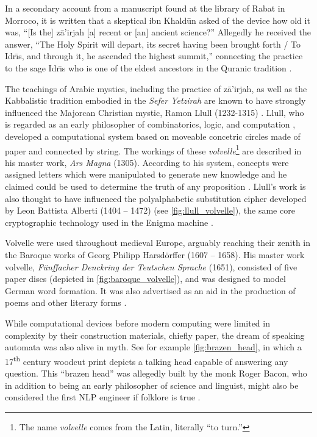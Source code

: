In a secondary account from a manuscript found at the library of Rabat in
Morroco, it is written that a skeptical ibn Khald\={u}n asked of the device
how old it was, ``[Is the] z\={a}'irjah [a] recent or [an] ancient science?''
Allegedly he received the answer, ``The  Holy  Spirit  will  depart,  its  secret
having been brought forth / To Idr\={\i}s, and through it, he ascended the
highest summit,'' connecting the practice to the sage Idr\={\i}s who is one of
the eldest ancestors in the Quranic tradition
\citep{rosenthal1958muqaddimah,link2010variantology}.
  
The teachings of Arabic mystics, including the practice of z\={a}'irjah, as
well as the Kabbalistic tradition embodied in the \textit{Sefer Yetzirah} are
known to have strongly influenced the Majorcan Christian mystic, Ramon Llull
(1232-1315) \citep{kahn1980,link2010variantology,sepllull}.  Llull, who is
regarded as an early philosopher of combinatorics, logic, and computation
\citep{bonner2007art,knuth2013art,sepllull}, developed a computational system
based on moveable concetric circles made of paper and connected by string. The
workings of these \textit{volvelle}\footnote{The name \textit{volvelle} comes
from the Latin, literally ``to turn.''} are described in his master work,
\textit{Ars Magna} (1305). According to his system, concepts were assigned
letters which were manipulated to generate new knowledge and he claimed could
be used to determine the truth of any proposition
\citep{Crupi2019VolvellesOK}. Llull's work is also thought to have influenced
the polyalphabetic substitution cipher developed by Leon Battista Alberti
(1404 -- 1472) (see \autoref{fig:llull_volvelle}), the same core cryptographic
technology used in the Enigma machine  \citep{kahn1980}.



 
 
Volvelle were used throughout medieval Europe, arguably reaching their zenith
in the Baroque works of Georg Philipp Harsd{\"o}rffer (1607 -- 1658). His
master work volvelle, \textit{F{\"u}nffacher Denckring der Teutschen Sprache}
(1651), consisted of five paper discs (depicted in
\autoref{fig:baroque_volvelle}), and was designed to model German word
formation. It was also advertised as an aid in the production of poems and
other literary forms \citep{schafer2006literary}.
  
While computational devices before modern computing were limited in complexity
by their construction materials, chiefly paper, the dream of speaking automata
was also alive in myth.  See for example \autoref{fig:brazen_head}, in which a
17\textsuperscript{th} century woodcut print depicts a talking head capable of
answering any question. This ``brazen head'' was allegedly built by the monk
Roger Bacon, who in addition to being an early philosopher of science and
linguist, might also be considered the first NLP engineer if folklore is true
\citep{hyman2016automaton,sep-roger-bacon}.

 
